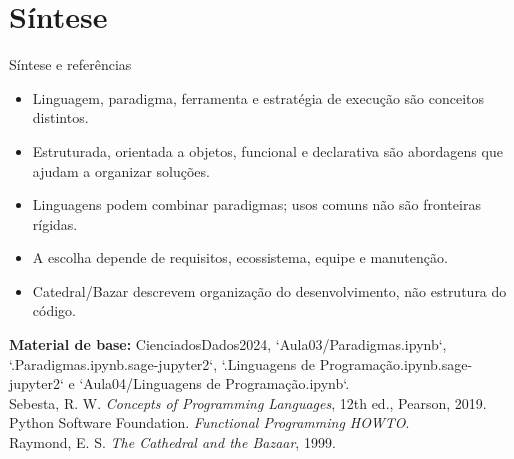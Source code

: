 \documentclass[aspectratio=169,10pt]{beamer}
\begin{document}
\section{Síntese}

\begin{frame}{Síntese e referências}
  \begin{itemize}
    \item Linguagem, paradigma, ferramenta e estratégia de execução são conceitos distintos.
    \item Estruturada, orientada a objetos, funcional e declarativa são abordagens que ajudam a organizar soluções.
    \item Linguagens podem combinar paradigmas; usos comuns não são fronteiras rígidas.
    \item A escolha depende de requisitos, ecossistema, equipe e manutenção.
    \item Catedral/Bazar descrevem organização do desenvolvimento, não estrutura do código.
  \end{itemize}
  \vspace{0.3em}
  \footnotesize
  \textbf{Material de base:} CienciadosDados2024, `Aula03/Paradigmas.ipynb`, `.Paradigmas.ipynb.sage-jupyter2`, `.Linguagens de Programação.ipynb.sage-jupyter2` e `Aula04/Linguagens de Programação.ipynb`.\\
  Sebesta, R. W. \textit{Concepts of Programming Languages}, 12th ed., Pearson, 2019.\\
  Python Software Foundation. \textit{Functional Programming HOWTO}.\\
  Raymond, E. S. \textit{The Cathedral and the Bazaar}, 1999.
\end{frame}
\end{document}
